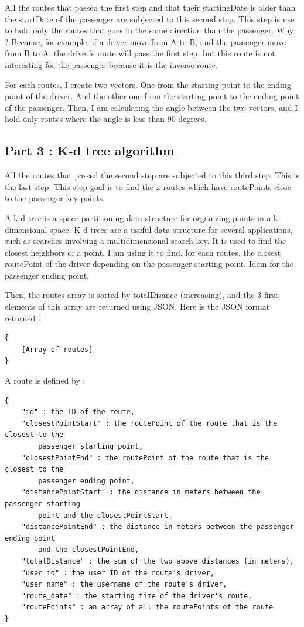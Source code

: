All the routes that passed the first step and that their startingDate is older than the startDate of the passenger are subjected to this second step. This step is use to hold only the routes that goes in the same direction than the passenger. Why ? Because, for example, if a driver move from A to B, and the passenger move from B to A, the driver's route will pass the first step, but this route is not interesting for the passenger because it is the inverse route.

For each routes, I create two vectors. One from the starting point to the ending point of the driver. 
And the other one from the starting point to the ending point of the passenger.
Then, I am calculating the angle between the two vectors, and I hold only routes where the angle is less than 90 degrees.

\subsection{Part 3 : K-d tree algorithm}

All the routes that passed the second step are subjected to this third step. This is the last step. This step goal is to find the x routes which have routePoints close to the passenger key points.

A k-d tree is a space-partitioning data structure for organizing points in a k-dimensional space.
K-d trees are a useful data structure for several applications, such as searches involving a multidimensional search key. It is used to find the closest neighbors
of a point. I am using it to find, for each routes, the closest routePoint of the driver depending on the passenger starting point. Idem for the passenger ending point.

Then, the routes array is sorted by totalDisance (increasing), and the 3 first elements of this array are returned using JSON. Here is the JSON format returned :

\begin{lstlisting}[style=DOS]
{
	[Array of routes]
}
\end{lstlisting}

A route is defined by :
\begin{lstlisting}[style=DOS]
{
	"id" : the ID of the route,
	"closestPointStart" : the routePoint of the route that is the closest to the
		passenger starting point,
	"closestPointEnd" : the routePoint of the route that is the closest to the 
		passenger ending point,
	"distancePointStart" : the distance in meters between the passenger starting 
		point and the closestPointStart,
	"distancePointEnd" : the distance in meters between the passenger ending point
		and the closestPointEnd,
	"totalDistance" : the sum of the two above distances (in meters),
	"user_id" : the user ID of the route's driver,
	"user_name" : the username of the route's driver,
	"route_date" : the starting time of the driver's route,
	"routePoints" : an array of all the routePoints of the route
}
\end{lstlisting}

